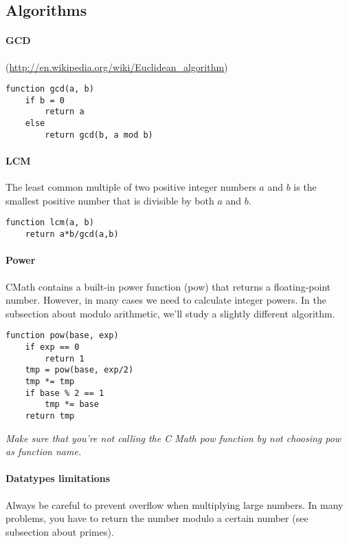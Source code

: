 \subsection{Algorithms}
\paragraph{GCD}

(\url{http://en.wikipedia.org/wiki/Euclidean_algorithm})
\begin{lstlisting}
function gcd(a, b)
    if b = 0
       	return a
    else
	    return gcd(b, a mod b)
\end{lstlisting}

\paragraph{LCM}
The least common multiple of two positive integer numbers $a$ and $b$ is the smallest positive number that is divisible by both $a$ and $b$.
\begin{lstlisting}
function lcm(a, b)
	return a*b/gcd(a,b)
\end{lstlisting}

\paragraph{Power}
CMath contains a built-in power function (pow) that returns a floating-point number. However, in many cases we need to calculate integer powers.
In the subsection about modulo arithmetic, we'll study a slightly different algorithm.
\begin{lstlisting}
function pow(base, exp)
	if exp == 0
		return 1
	tmp = pow(base, exp/2)
	tmp *= tmp
	if base % 2 == 1
		tmp *= base
	return tmp
\end{lstlisting}
\emph{Make sure that you're not calling the C Math pow function by not choosing pow as function name.}

\paragraph{Datatypes limitations} Always be careful to prevent overflow when multiplying large numbers. In many problems, you have to return the number modulo a certain number (see subsection about primes).
